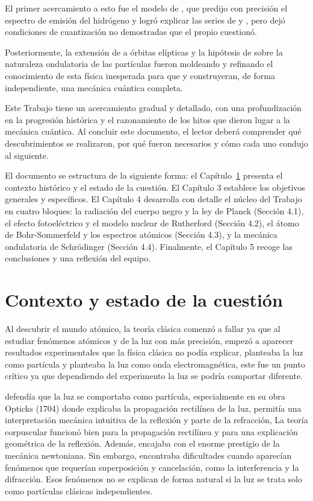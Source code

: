 \documentclass[11pt,a4paper,spanish]{book}
\begin{document}
El primer acercamiento a esto fue el modelo de \cite{bohr1913}, que
predijo con precisión el espectro de emisión del hidrógeno y logró
explicar las series de
\cite{balmer1885} y \cite{lyman1906}, pero dejó condiciones de
cuantización no demostradas que el propio \cite{rutherford1913carta} cuestionó.

Posteriormente, la extensión
de \cite{sommerfeld1916} a órbitas elípticas y la hipótesis de
\cite{debroglie1924} sobre la naturaleza ondulatoria de las
partículas fueron moldeando y refinando el conocimiento de esta
física inesperada para que \cite{schrodinger1926} y
\cite{heisenberg1925} construyeran, de forma independiente, una
mecánica cuántica completa.

Este Trabajo tiene un acercamiento gradual y detallado, con una
profundización en la progresión histórica y el razonamiento de los
hitos que dieron lugar a la mecánica cuántica. Al concluir este documento, el
lector deberá comprender qué descubrimientos se realizaron, por qué
fueron necesarios y cómo cada uno condujo al siguiente.

El documento se estructura de la siguiente forma: el
Capítulo~\ref{contexto} presenta el contexto histórico y el estado de
la cuestión. El Capítulo 3 establece los objetivos generales y
específicos. El Capítulo 4 desarrolla con detalle el núcleo del
Trabajo en cuatro
bloques: la radiación del cuerpo negro y la ley de Planck (Sección
4.1), el efecto fotoeléctrico y el modelo nuclear de Rutherford
(Sección 4.2), el átomo de Bohr-Sommerfeld y los espectros atómicos
(Sección 4.3), y la mecánica ondulatoria de Schrödinger (Sección
4.4). Finalmente, el Capítulo 5 recoge las conclusiones y una
reflexión del equipo.

\chapter{Contexto y estado de la cuestión}\label{contexto}

Al descubrir el mundo atómico, la teoría clásica comenzó a fallar
ya que al estudiar fenómenos atómicos y de la luz con más precisión,
empezó a aparecer resultados experimentales que la física clásica no
podía explicar, \cite{newton1704} planteaba la luz como partícula y
\cite{maxwell1865}
planteaba la luz como onda electromagnética, este fue un punto
crítico ya que dependiendo del experimento la luz se podría
comportar diferente.

\cite{newton1704} defendía que la luz se comportaba como partícula,
especialmente en su obra Opticks (1704) donde explicaba la
propagación rectilínea de la luz, permitía una interpretación
mecánica intuitiva de la reflexión y parte de la refracción,
La teoría corpuscular funcionó bien para la propagación rectilínea
y para una explicación geométrica de la reflexión. Además, encajaba
con el enorme prestigio de la mecánica newtoniana. Sin embargo,
encontraba dificultades cuando aparecían fenómenos que requerían
superposición y cancelación, como la interferencia y la difracción.
Esos fenómenos no se explican de forma natural si la luz se trata
solo como partículas clásicas independientes.
\end{document}
